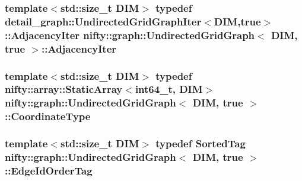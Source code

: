 \subsubsection[{Adjacency\+Iter}]{\setlength{\rightskip}{0pt plus 5cm}template$<$std\+::size\+\_\+t D\+I\+M$>$ typedef {\bf detail\+\_\+graph\+::\+Undirected\+Grid\+Graph\+Iter}$<$D\+I\+M,true$>$\+::{\bf Adjacency\+Iter} {\bf nifty\+::graph\+::\+Undirected\+Grid\+Graph}$<$ D\+I\+M, true $>$\+::{\bf Adjacency\+Iter}}\label{classnifty_1_1graph_1_1UndirectedGridGraph_3_01DIM_00_01true_01_4_a9779969eb8762908d43eab3d9d3b17b1}
\hypertarget{classnifty_1_1graph_1_1UndirectedGridGraph_3_01DIM_00_01true_01_4_a45f38cce72559c7bdefa3d219486bae4}{}
\subsubsection[{Coordinate\+Type}]{\setlength{\rightskip}{0pt plus 5cm}template$<$std\+::size\+\_\+t D\+I\+M$>$ typedef {\bf nifty\+::array\+::\+Static\+Array}$<$int64\+\_\+t, D\+I\+M$>$ {\bf nifty\+::graph\+::\+Undirected\+Grid\+Graph}$<$ D\+I\+M, true $>$\+::{\bf Coordinate\+Type}}\label{classnifty_1_1graph_1_1UndirectedGridGraph_3_01DIM_00_01true_01_4_a45f38cce72559c7bdefa3d219486bae4}
\hypertarget{classnifty_1_1graph_1_1UndirectedGridGraph_3_01DIM_00_01true_01_4_aca991599ad4c8532f2d07ed7bc507449}{}
\subsubsection[{Edge\+Id\+Order\+Tag}]{\setlength{\rightskip}{0pt plus 5cm}template$<$std\+::size\+\_\+t D\+I\+M$>$ typedef {\bf Sorted\+Tag} {\bf nifty\+::graph\+::\+Undirected\+Grid\+Graph}$<$ D\+I\+M, true $>$\+::{\bf Edge\+Id\+Order\+Tag}}\label{classnifty_1_1graph_1_1UndirectedGridGraph_3_01DIM_00_01true_01_4_aca991599ad4c8532f2d07ed7bc507449}
\hypertarget{classnifty_1_1graph_1_1UndirectedGridGraph_3_01DIM_00_01true_01_4_a0d9a24c893bf3f5f0cd61873bb77dfe1}{}
